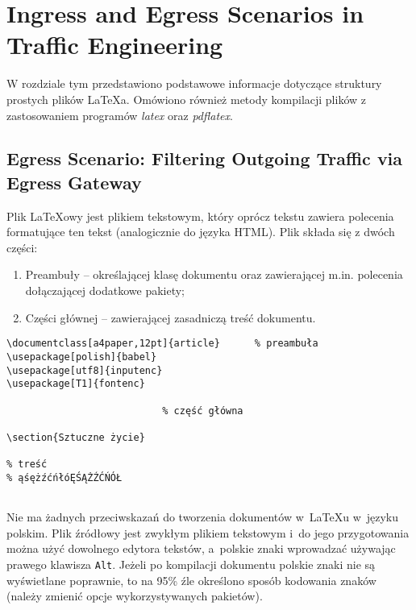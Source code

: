 \chapter{Ingress and Egress Scenarios in Traffic Engineering}
\label{cha:scenarios}

W rozdziale tym przedstawiono podstawowe informacje dotyczące struktury prostych plików \LaTeX a. Omówiono również metody kompilacji plików z zastosowaniem programów \emph{latex} oraz \emph{pdflatex}.


\section{Egress Scenario: Filtering Outgoing Traffic via Egress Gateway}
\label{sec:egress}

Plik \LaTeX owy jest plikiem tekstowym, który oprócz tekstu zawiera polecenia formatujące ten tekst (analogicznie do języka HTML). Plik składa się z dwóch części:
\begin{enumerate}%
\item Preambuły -- określającej klasę dokumentu oraz zawierającej m.in. polecenia dołączającej dodatkowe pakiety;

\item Części głównej -- zawierającej zasadniczą treść dokumentu.
\end{enumerate}


\begin{lstlisting}
\documentclass[a4paper,12pt]{article}      % preambuła
\usepackage[polish]{babel}
\usepackage[utf8]{inputenc}
\usepackage[T1]{fontenc}

                           % część główna

\section{Sztuczne życie}

% treść
% ąśężźćńłóĘŚĄŻŹĆŃÓŁ


\end{lstlisting}

Nie ma żadnych przeciwskazań do tworzenia dokumentów w~\LaTeX u w~języku polskim. Plik źródłowy jest zwykłym plikiem tekstowym i~do jego przygotowania można użyć dowolnego edytora tekstów, a~polskie znaki wprowadzać używając prawego klawisza \texttt{Alt}. Jeżeli po kompilacji dokumentu polskie znaki nie są wyświetlane poprawnie, to na 95\% źle określono sposób kodowania znaków (należy zmienić opcje wykorzystywanych pakietów).


